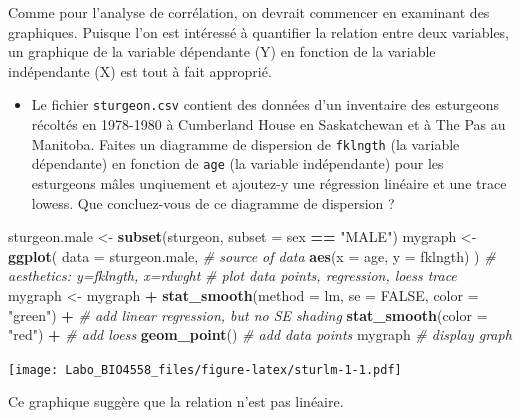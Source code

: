 \documentclass[
  12pt,
]{book}
\newenvironment{Shaded}{\begin{snugshade}}{\end{snugshade}}
\newcommand{\CommentTok}[1]{\textcolor[rgb]{0.56,0.35,0.01}{\textit{#1}}}
\newcommand{\DataTypeTok}[1]{\textcolor[rgb]{0.13,0.29,0.53}{#1}}
\newcommand{\KeywordTok}[1]{\textcolor[rgb]{0.13,0.29,0.53}{\textbf{#1}}}
\newcommand{\NormalTok}[1]{#1}
\newcommand{\OperatorTok}[1]{\textcolor[rgb]{0.81,0.36,0.00}{\textbf{#1}}}
\newcommand{\OtherTok}[1]{\textcolor[rgb]{0.56,0.35,0.01}{#1}}
\newcommand{\StringTok}[1]{\textcolor[rgb]{0.31,0.60,0.02}{#1}}
\providecommand{\tightlist}{%
  \setlength{\itemsep}{0pt}\setlength{\parskip}{0pt}}
\begin{document}
Comme pour l'analyse de corrélation, on devrait commencer en examinant des graphiques.
Puisque l'on est intéressé à quantifier la relation entre deux variables, un graphique de la variable dépendante (Y) en fonction de la variable indépendante (X) est tout à fait approprié.

\begin{itemize}
\tightlist
\item
  Le fichier \texttt{sturgeon.csv} contient des données d'un inventaire des esturgeons récoltés en 1978-1980 à Cumberland House en Saskatchewan et à The Pas au Manitoba.
  Faites un diagramme de dispersion de \texttt{fklngth} (la variable dépendante) en fonction de \texttt{age} (la variable indépendante) pour les esturgeons mâles unqiuement et ajoutez-y une régression linéaire et une trace lowess.
  Que concluez-vous de ce diagramme de dispersion ?
\end{itemize}

\begin{Shaded}
\begin{Highlighting}[]
\NormalTok{sturgeon.male \textless{}{-}}\StringTok{ }\KeywordTok{subset}\NormalTok{(sturgeon, }\DataTypeTok{subset =}\NormalTok{ sex }\OperatorTok{==}\StringTok{ "MALE"}\NormalTok{)}
\NormalTok{mygraph \textless{}{-}}\StringTok{ }\KeywordTok{ggplot}\NormalTok{(}
  \DataTypeTok{data =}\NormalTok{ sturgeon.male, }\CommentTok{\# source of data}
  \KeywordTok{aes}\NormalTok{(}\DataTypeTok{x =}\NormalTok{ age, }\DataTypeTok{y =}\NormalTok{ fklngth)}
\NormalTok{) }\CommentTok{\# aesthetics: y=fklngth, x=rdwght}
\CommentTok{\# plot data points, regression, loess trace}
\NormalTok{mygraph \textless{}{-}}\StringTok{ }\NormalTok{mygraph }\OperatorTok{+}
\StringTok{  }\KeywordTok{stat\_smooth}\NormalTok{(}\DataTypeTok{method =}\NormalTok{ lm, }\DataTypeTok{se =} \OtherTok{FALSE}\NormalTok{, }\DataTypeTok{color =} \StringTok{"green"}\NormalTok{) }\OperatorTok{+}\StringTok{ }\CommentTok{\# add linear regression, but no SE shading}
\StringTok{  }\KeywordTok{stat\_smooth}\NormalTok{(}\DataTypeTok{color =} \StringTok{"red"}\NormalTok{) }\OperatorTok{+}\StringTok{ }\CommentTok{\# add loess}
\StringTok{  }\KeywordTok{geom\_point}\NormalTok{() }\CommentTok{\# add data points}
\NormalTok{mygraph }\CommentTok{\# display graph}
\end{Highlighting}
\end{Shaded}

\texttt{[image: Labo\_BIO4558\_files/figure-latex/sturlm-1-1.pdf]}

Ce graphique suggère que la relation n'est pas linéaire.
\end{document}
